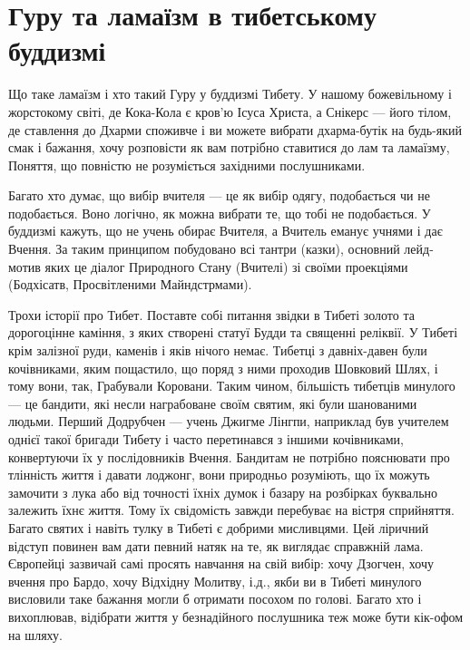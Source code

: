 \section{Гуру та ламаїзм в тибетському буддизмі}

Що таке ламаїзм і хто такий Гуру у буддизмі Тибету.
У нашому божевільному і жорстокому світі, де Кока-Кола
є кров'ю Ісуса Христа, а Снікерс --- його тілом, де ставлення
до Дхарми споживче і ви можете вибрати дхарма-бутік на будь-який
смак і бажання, хочу розповісти як вам потрібно ставитися до лам
та ламаїзму, Поняття, що повністю не розуміється західними послушниками.

Багато хто думає, що вибір вчителя --- це як вибір одягу,
подобається чи не подобається. Воно логічно, як можна вибрати
те, що тобі не подобається. У буддизмі кажуть, що не учень обирає
Вчителя, а Вчитель еманує учнями і дає Вчення. За таким принципом
побудовано всі тантри (казки), основний лейд-мотив яких це діалог
Природного Стану (Вчителі) зі своїми проекціями (Бодхісатв, Просвітленими Майндстрмами).

Трохи історії про Тибет. Поставте собі питання звідки в Тибеті
золото та дорогоцінне каміння, з яких створені статуї Будди та
священні реліквії. У Тибеті крім залізної руди, каменів і яків нічого немає.
Тибетці з давніх-давен були кочівниками, яким пощастило, що поряд
з ними проходив Шовковий Шлях, і тому вони, так, Грабували Коровани.
Таким чином, більшість тибетців минулого --- це бандити, які несли
награбоване своїм святим, які були шанованими людьми. Перший Додрубчен ---
учень Джигме Лінгпи, наприклад був учителем однієї такої бригади Тибету
і часто перетинався з іншими кочівниками, конвертуючи їх у послідовників Вчення.
Бандитам не потрібно пояснювати про тлінність життя і давати лоджонг,
вони природньо розуміють, що їх можуть замочити з лука або від точності їхніх
думок і базару на розбірках буквально залежить їхнє життя. Тому їх свідомість
завжди перебуває на вістря сприйняття. Багато святих і навіть тулку в Тибеті
є добрими мисливцями. Цей ліричний відступ повинен вам дати певний натяк на те,
як виглядає справжній лама. Європейці зазвичай самі просять навчання
на свій вибір: хочу Дзогчен, хочу вчення про Бардо, хочу Відхідну Молитву, і.д.,
якби ви в Тибеті минулого висловили таке бажання могли б отримати
посохом по голові. Багато хто і вихоплював, відібрати життя у безнадійного
послушника теж може бути кік-офом на шляху.

